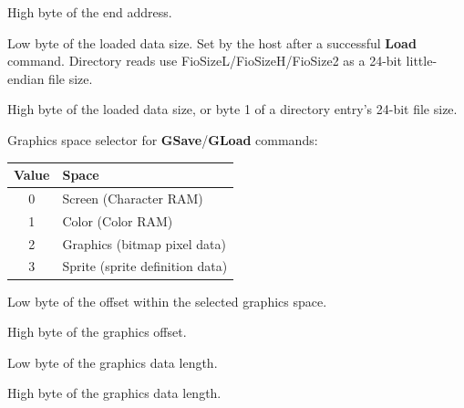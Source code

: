 High byte of the end address.



Low byte of the loaded data size.  Set by the host after a successful
\textbf{Load} command.  Directory reads use FioSizeL/FioSizeH/FioSize2 as a
24-bit little-endian file size.


High byte of the loaded data size, or byte 1 of a directory entry's 24-bit
file size.



Graphics space selector for \textbf{GSave}/\textbf{GLoad} commands:

\begin{center}
\small
\begin{tabular}{@{}cl@{}}
\toprule
\textbf{Value} & \textbf{Space} \\
\midrule
0 & Screen (Character RAM) \\
1 & Color (Color RAM) \\
2 & Graphics (bitmap pixel data) \\
3 & Sprite (sprite definition data) \\
\bottomrule
\end{tabular}
\end{center}



Low byte of the offset within the selected graphics space.


High byte of the graphics offset.



Low byte of the graphics data length.


High byte of the graphics data length.


